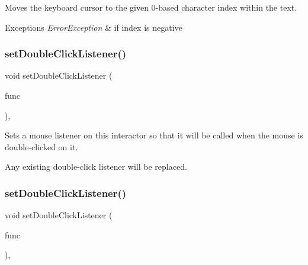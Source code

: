 Moves the keyboard cursor to the given 0-\/based character index within the text. 


\begin{DoxyExceptions}{Exceptions}
{\em Error\+Exception} & if index is negative \\
\hline
\end{DoxyExceptions}
\mbox{\label{classGInteractor_ac29f9a3462458e165fae3a1f046ee77a}} 
\subsubsection{\texorpdfstring{set\+Double\+Click\+Listener()}{setDoubleClickListener()}\hspace{0.1cm}{\footnotesize\ttfamily [1/2]}}
{\footnotesize\ttfamily void set\+Double\+Click\+Listener (\begin{DoxyParamCaption}\item[{G\+Event\+Listener}]{func }\end{DoxyParamCaption})\hspace{0.3cm}{\ttfamily [virtual]}, {\ttfamily [inherited]}}



Sets a mouse listener on this interactor so that it will be called when the mouse is double-\/clicked on it. 

Any existing double-\/click listener will be replaced. \mbox{\label{classGInteractor_a50096194d66f48c92dd4c512d41bfc76}} 
\subsubsection{\texorpdfstring{set\+Double\+Click\+Listener()}{setDoubleClickListener()}\hspace{0.1cm}{\footnotesize\ttfamily [2/2]}}
{\footnotesize\ttfamily void set\+Double\+Click\+Listener (\begin{DoxyParamCaption}\item[{G\+Event\+Listener\+Void}]{func }\end{DoxyParamCaption})\hspace{0.3cm}{\ttfamily [virtual]}, {\ttfamily [inherited]}}



